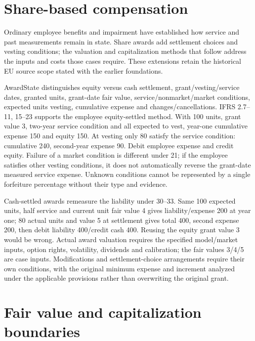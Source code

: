 \hypertarget{share-based-compensation}{%
\section{Share-based compensation}\label{method-corporate-extensions-share-based-compensation}}

Ordinary employee benefits and impairment have established how service and
past measurements remain in state. Share awards add settlement choices and
vesting conditions; the valuation and capitalization methods that follow
address the inputs and costs those cases require. These extensions retain
the historical EU source scope stated with the earlier foundations.

AwardState distinguishes equity versus cash settlement, grant/vesting/service dates, granted units, grant-date fair value, service/nonmarket/market conditions, expected units vesting, cumulative expense and changes/cancellations. IFRS 2.7--11, 15--23 supports the employee equity-settled method. With 100 units, grant value 3, two-year service condition and all expected to vest, year-one cumulative expense 150 and equity 150. At vesting only 80 satisfy the service condition: cumulative 240, second-year expense 90. Debit employee expense and credit equity. Failure of a market condition is different under 21; if the employee satisfies other vesting conditions, it does not automatically reverse the grant-date measured service expense. Unknown conditions cannot be represented by a single forfeiture percentage without their type and evidence.

Cash-settled awards remeasure the liability under 30--33. Same 100 expected units, half service and current unit fair value 4 gives liability/expense 200 at year one; 80 actual units and value 5 at settlement gives total 400, second expense 200, then debit liability 400/credit cash 400. Reusing the equity grant value 3 would be wrong. Actual award valuation requires the specified model/market inputs, option rights, volatility, dividends and calibration; the fair values 3/4/5 are case inputs. Modifications and settlement-choice arrangements require their own conditions, with the original minimum expense and increment analyzed under the applicable provisions rather than overwriting the original grant.

\hypertarget{fair-value-and-capitalization-boundaries}{%
\section{Fair value and capitalization boundaries}\label{method-corporate-extensions-fair-value-and-capitalization-boundaries}}

